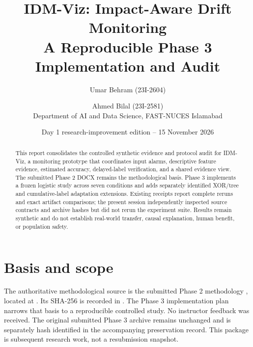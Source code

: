 \documentclass[10pt]{article}
\title{IDM-Viz: Impact-Aware Drift Monitoring\\A Reproducible Phase 3 Implementation and Audit}
\author{Umar Behram (23I-2604) \and Ahmed Bilal (23I-2581)\\Department of AI and Data Science, FAST-NUCES Islamabad}
\date{Day 1 research-improvement edition -- 15 November 2026}
\begin{document}
\maketitle
\begin{abstract}
This report consolidates the controlled synthetic evidence and protocol audit for IDM-Viz, a monitoring prototype that coordinates input alarms, descriptive feature evidence, estimated accuracy, delayed-label verification, and a shared evidence view. The submitted Phase 2 DOCX remains the methodological basis. Phase 3 implements a frozen logistic study across seven conditions and adds separately identified XOR/tree and cumulative-label adaptation extensions. Existing receipts report complete reruns and exact artifact comparisons; the present session independently inspected source contracts and archive hashes but did not rerun the experiment suite. Results remain synthetic and do not establish real-world transfer, causal explanation, human benefit, or population safety.
\end{abstract}

\section{Basis and scope}
\begin{sloppypar}
The authoritative methodological source is the submitted Phase 2 methodology \cite{phase2methodology}, located at . Its SHA-256 is recorded in . The Phase 3 implementation plan narrows that basis to a reproducible controlled study. No instructor feedback was received. The original submitted Phase 3 archive remains unchanged and is separately hash identified in the accompanying preservation record. This package is subsequent research work, not a resubmission snapshot.
\end{sloppypar}
\end{document}
